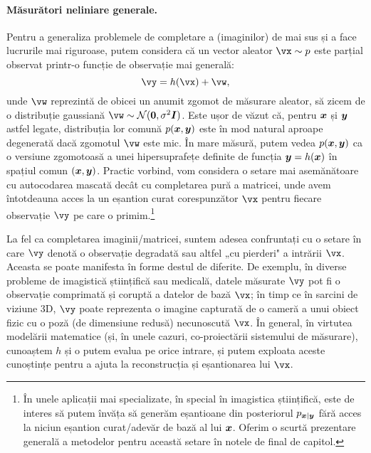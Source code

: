 \documentclass[../../book-main_ro.tex]{subfiles}
\begin{document}
\paragraph{Măsurători neliniare generale.}
Pentru a generaliza problemele de completare a (imaginilor) de mai sus și a face lucrurile mai riguroase, putem considera că un vector aleator $\vx \sim p$ este parțial observat printr-o funcție de observație mai
generală:
\begin{equation}\label{eq:measurement-matching-observation}
\vy = h(\vx) + \vw,
\end{equation}
unde $\vw$ reprezintă de obicei un anumit zgomot de măsurare aleator, să zicem de
o distribuție gaussiană $\vw \sim \mathcal{N}(\mathbf{0}, \sigma^2
\boldsymbol{I})$. Este ușor de văzut că, pentru $\bm{x}$ și $\bm{y}$ astfel legate, distribuția lor comună $p(\bm{x}, \bm{y})$ este în mod natural aproape degenerată dacă zgomotul $\vw$ este mic. În mare măsură, putem vedea $p(\bm{x}, \bm{y})$ ca o versiune zgomotoasă a unei hipersuprafețe definite de funcția $\bm{y} = h(\bm{x})$ în spațiul comun $(\bm{x}, \bm{y})$. Practic vorbind, vom considera o setare mai asemănătoare cu autocodarea mascată decât cu completarea pură a matricei, unde avem întotdeauna acces la un eșantion curat corespunzător $\vx$ pentru fiecare observație $\vy$ pe care o primim.\footnote{În unele aplicații mai specializate, în special în imagistica științifică, este de interes să putem învăța să generăm eșantioane din posteriorul $p_{\bm{x} \mid \bm{y}}$ fără acces la niciun eșantion curat/adevăr de bază al lui $\bm{x}$. Oferim o scurtă prezentare generală a metodelor pentru această setare în notele de final de capitol.}

La fel ca completarea imaginii/matricei, suntem
adesea confruntați cu o setare în care $\vy$ denotă o observație degradată sau altfel
„cu pierderi"
a intrării $\vx$. Aceasta se poate manifesta în forme destul de diferite.
De exemplu, în diverse probleme de imagistică științifică sau
medicală, datele măsurate $\vy$ pot fi o observație comprimată și
coruptă a datelor de bază $\vx$; în timp ce în sarcini de viziune 3D,
$\vy$ poate reprezenta o imagine capturată de o cameră a unui obiect fizic cu o
poză (de dimensiune redusă) necunoscută $\vx$.
În general, în virtutea modelării matematice (și, în unele cazuri, co-proiectării
sistemului de măsurare), cunoaștem $h$ și o putem evalua pe orice intrare, și
putem exploata aceste cunoștințe pentru a ajuta la reconstrucția și eșantionarea lui $\vx$.
\end{document}
